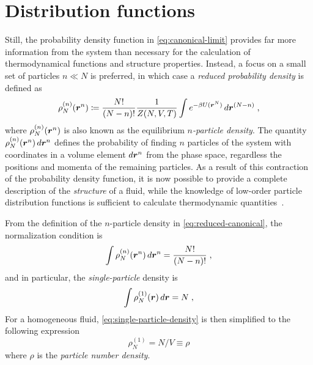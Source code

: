 \section{Distribution functions}

Still, the probability density function in \autoref{eq:canonical-limit} provides far more
information from the system than necessary for the calculation of thermodynamical functions
and structure properties. Instead, a focus on a small set of particles $n \ll N$ is 
preferred, in which case a \emph{reduced probability density} is defined as
\begin{equation}
    \rho^{(n)}_{N} (\bm{r}^{n}) \coloneqq \frac{N!}{(N-n)!} \frac{1}{Z(N,V,T)}
    \int e^{- \beta U(\bm{r}^{N})} \, d \bm{r}^{(N-n)} \; ,
    \label{eq:reduced-canonical}
\end{equation}
where $\rho^{(n)}_{N} (\bm{r}^{n})$ is also known as the equilibrium 
$n$\emph{-particle density}.
The quantity $\rho^{(n)}_{N} (\bm{r}^{n}) \, d \bm{r}^{n}$ defines the probability of finding
$n$ particles of the system with coordinates in a volume element $d \bm{r}^{n}$ from the
phase space, regardless the positions and momenta of the remaining particles.
As a result of this contraction of the probability density function, it is now possible to
provide a complete description of the \emph{structure} of a fluid, while the knowledge
of low-order particle distribution functions is sufficient to calculate thermodynamic
quantities~\cite{mcquarrieStatisticalMechanics2000}.

From the definition of the $n$-particle density in \autoref{eq:reduced-canonical}, the
normalization condition is
\begin{equation}
    \int \rho^{(n)}_{N} (\bm{r}^{n}) \, d \bm{r}^{n} = \frac{N!}{(N-n)!} \; ,
    \label{eq:normalization-reduced}
\end{equation}
and in particular, the \emph{single-particle} density is
\begin{equation}
    \int \rho^{(1)}_{N} (\bm{r}) \, d \bm{r} = N \; ,
    \label{eq:single-particle-density}
\end{equation}
For a homogeneous fluid, \autoref{eq:single-particle-density} is then simplified
to the following expression
\begin{equation}
    \rho^{(1)}_{N} = N / V \equiv \rho
    \label{eq:homogeneous-density}
\end{equation}
where $\rho$ is the \emph{particle number density}.

